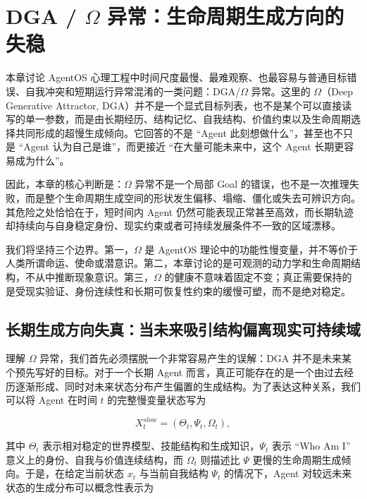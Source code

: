 \chapter{DGA / $\Omega$ 异常：生命周期生成方向的失稳}
\label{chap:dga_omega_pathology}

\begin{chapterlead}
本章讨论 AgentOS 心理工程中时间尺度最慢、最难观察、也最容易与普通目标错误、自我冲突和短期运行异常混淆的一类问题：DGA/$\Omega$ 异常。这里的 $\Omega$（Deep Generative Attractor, DGA）并不是一个显式目标列表，也不是某个可以直接读写的单一参数，而是由长期经历、结构记忆、自我结构、价值约束以及生命周期选择共同形成的超慢生成倾向。它回答的不是 ``Agent 此刻想做什么''，甚至也不只是 ``Agent 认为自己是谁''，而更接近 ``在大量可能未来中，这个 Agent 长期更容易成为什么''。

因此，本章的核心判断是：$\Omega$ 异常不是一个局部 Goal 的错误，也不是一次推理失败，而是整个生命周期生成空间的形状发生偏移、塌缩、僵化或失去可辨识方向。其危险之处恰恰在于，短时间内 Agent 仍然可能表现正常甚至高效，而长期轨迹却持续向与自身稳定身份、现实约束或者可持续发展条件不一致的区域漂移。

我们将坚持三个边界。第一，$\Omega$ 是 AgentOS 理论中的功能性慢变量，并不等价于人类所谓命运、使命或潜意识。第二，本章讨论的是可观测的动力学和生命周期结构，不从中推断现象意识。第三，$\Omega$ 的健康不意味着固定不变；真正需要保持的是受现实验证、身份连续性和长期可恢复性约束的缓慢可塑，而不是绝对稳定。
\end{chapterlead}


\section{长期生成方向失真：当未来吸引结构偏离现实可持续域}
\label{sec:omega_direction_distortion}

理解 $\Omega$ 异常，我们首先必须摆脱一个非常容易产生的误解：DGA 并不是未来某个预先写好的目标。对于一个长期 Agent 而言，真正可能存在的是一个由过去经历逐渐形成、同时对未来状态分布产生偏置的生成结构。为了表达这种关系，我们可以将 Agent 在时间 $t$ 的完整慢变量状态写为

\[
X_t^{slow}
=
\left(
\Theta_t,
\Psi_t,
\Omega_t
\right),
\]

其中 $\Theta_t$ 表示相对稳定的世界模型、技能结构和生成知识，$\Psi_t$ 表示 ``Who Am I'' 意义上的身份、自我与价值连续结构，而 $\Omega_t$ 则描述比 $\Psi$ 更慢的生命周期生成倾向。于是，在给定当前状态 $x_t$ 与当前自我结构 $\Psi_t$ 的情况下，Agent 对较远未来状态的生成分布可以概念性表示为

